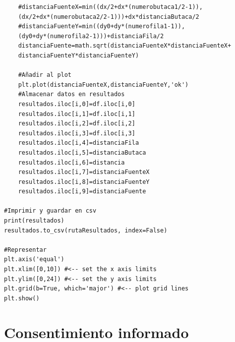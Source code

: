 \documentclass[11pt,a4paper]{book}
\begin{document}
\begin{verbatim}
    #distanciaFuenteX=min((dx/2+dx*(numerobutaca1/2-1)),
    (dx/2+dx*(numerobutaca2/2-1)))+dx*distanciaButaca/2
    #distanciaFuenteY=min((dy0+dy*(numerofila1-1)),
    (dy0+dy*(numerofila2-1)))+distanciaFila/2
    distanciaFuente=math.sqrt(distanciaFuenteX*distanciaFuenteX+
    distanciaFuenteY*distanciaFuenteY)

    #Añadir al plot
    plt.plot(distanciaFuenteX,distanciaFuenteY,'ok')
    #Almacenar datos en resultados
    resultados.iloc[i,0]=df.iloc[i,0]
    resultados.iloc[i,1]=df.iloc[i,1]
    resultados.iloc[i,2]=df.iloc[i,2]
    resultados.iloc[i,3]=df.iloc[i,3]
    resultados.iloc[i,4]=distanciaFila
    resultados.iloc[i,5]=distanciaButaca
    resultados.iloc[i,6]=distancia
    resultados.iloc[i,7]=distanciaFuenteX
    resultados.iloc[i,8]=distanciaFuenteY
    resultados.iloc[i,9]=distanciaFuente

#Imprimir y guardar en csv
print(resultados)
resultados.to_csv(rutaResultados, index=False)

#Representar
plt.axis('equal')
plt.xlim([0,10]) #<-- set the x axis limits
plt.ylim([0,24]) #<-- set the y axis limits
plt.grid(b=True, which='major') #<-- plot grid lines
plt.show()
\end{verbatim}

\chapter{Consentimiento informado}
    
    
\end{document}
